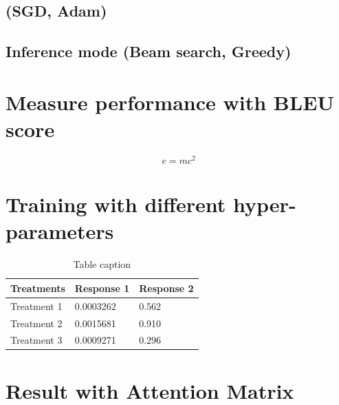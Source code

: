 \documentclass[preprint,12pt]{elsarticle}
\begin{document}
\subsection{(SGD, Adam)}

\subsection{Inference mode (Beam search, Greedy)}

\section{Measure performance with BLEU score}
\label{S:2}

\begin{equation}
\label{eq:emc}
e = mc^2
\end{equation}

\section{Training with different hyper-parameters}
\label{S:3}

\begin{table}[h]
\centering
\begin{tabular}{l l l}
\hline
\textbf{Treatments} & \textbf{Response 1} & \textbf{Response 2}\\
\hline
Treatment 1 & 0.0003262 & 0.562 \\
Treatment 2 & 0.0015681 & 0.910 \\
Treatment 3 & 0.0009271 & 0.296 \\
\hline
\end{tabular}
\caption{Table caption}
\end{table}


\section{Result with Attention Matrix}
\label{S:4}



\end{document}
